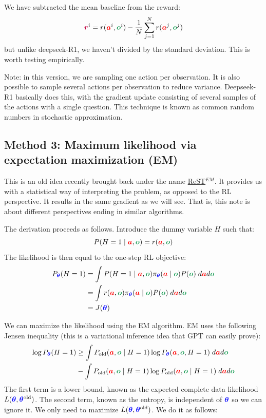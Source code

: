 \documentclass{article}
\newcommand{\colsym}[2]{\ensuremath{\textcolor{#1}{\boldsymbol{#2}}}}
\newcommand{\action}{\colsym{red}{a}}
\newcommand{\obs}{\colsym{ForestGreen}{o}}
\newcommand{\reward}{\colsym{purple}{r}}
\newcommand{\params}{\colsym{blue}{\theta}}
\begin{document}
We have subtracted the mean baseline from the reward:
\[
   \reward^i = r(\action^i, \obs^i) - \frac{1}{N} \sum_{j=1}^N r(\action^j, \obs^j)
\]
but unlike deepseek-R1, we haven't divided by the standard deviation. This is worth testing empirically.

Note: in this version, we are sampling one action per observation. It is also possible to sample several actions per observation to reduce variance. Deepseek-R1 basically does this, with the gradient update consisting of several samples of the actions with a single question. This technique is known as common random numbers in stochastic approximation.  




\subsection{Method 3: Maximum likelihood via expectation maximization (EM)}

This is an old idea recently brought back under the name \href{https://arxiv.org/abs/2312.06585}{ReST$^{EM}$}. It provides us with a statistical way of interpreting the problem, as opposed to the RL perspective. It results in the same gradient as we will see. That is, this note is about different perspectives ending in similar algorithms.

The derivation proceeds as follows. Introduce the dummy variable $H$ such that:
\[
P(H=1 \mid \action, \obs) = r(\action, \obs)
\]
The likelihood is then equal to the one-step RL objective:
\begin{align*}
P_{\params}(H=1) &= \int P(H=1 \mid \action, \obs) \pi_{\params}(\action \mid \obs) P(\obs) \; d\action d\obs
\\
&= \int r(\action, \obs) \pi_{\params}(\action \mid \obs) P(\obs) \; d\action d\obs
\\
&= J(\params)
\end{align*}

We can maximize the likelihood using the EM algorithm. EM uses the following Jensen inequality (this is a variational inference idea that GPT can easily prove):
\begin{align*}
\log P_{\params}(H=1) &\geq \int P_{\text{old}}(\action, \obs \mid H=1) \log P_{\params}(\action, \obs, H=1) \; d\action d\obs \\
&-
\int P_{\text{old}}(\action, \obs \mid H=1) \log P_{\text{old}}(\action, \obs \mid H=1) \; d\action d\obs
\end{align*}
The first term is a lower bound, known as the
expected complete data likelihood $L(\params, \params^{\text{old}})$.
The second term, known as the entropy, is independent of $\params$ so we can ignore it. We only need to maximize $L(\params, \params^{\text{old}})$. We do it as follows:
\end{document}
